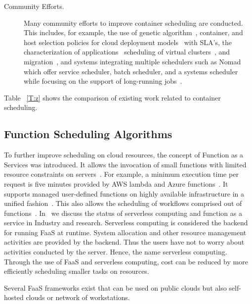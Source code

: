 \documentclass[final,5p,times,twocolumn]{elsarticle}
\begin{document}
\begin{description}
\item[Community Efforts.] Many community efforts to improve container scheduling are conducted. This includes, for example, the use of genetic algorithm~\cite{guerrero2018genetic}, container, and host selection policies for cloud deployment models~\cite{hanafy2017novel} with SLA's, the characterization of applications~\cite{medel2017client} scheduling of virtual clusters~\cite{dziurzanskivalue}, and migration~\cite{Flocker2018}, and systems integrating multiple schedulers such as Nomad which offer service scheduler, batch scheduler, and a systems scheduler while focusing on the support of long-running jobs~\cite{Nomad2018}.

\end{description}


Table ~\ref{T:z} shows the comparison of existing work related to container scheduling.




%






\subsection{Function Scheduling Algorithms}
\label{sec:faas}

To further improve scheduling on cloud resources, the concept of Function as a Services was introduced. It allows the invocation of small functions with limited resource constraints on servers~\cite{lasbook}. For example, a minimum execution time per request is five minutes provided by AWS lambda and Azure functions~\cite{ServerlessComputing2018}. It supports managed user-defined functions on highly available infrastructure in a unified fashion~\cite{nastic2017serverless}. This also allows the scheduling of workflows comprised out of functions~\cite{alqaryouti2018serverless}. In~\cite{fox2017status} we discuss the status of serverless computing and function as a service in Industry and research. Serverless computing is considered the backend for running FaaS at runtime. System allocation and other resource management activities are provided by the backend. Thus the users have not to worry about activities conducted by the server. Hence, the name serverless computing. Through the use of FaaS and serverless computing, cost can be reduced by more efficiently scheduling smaller tasks on resources.

Several FaaS frameworks exist that can be used on public clouds but also self-hosted clouds or network of workstations.
\end{document}
